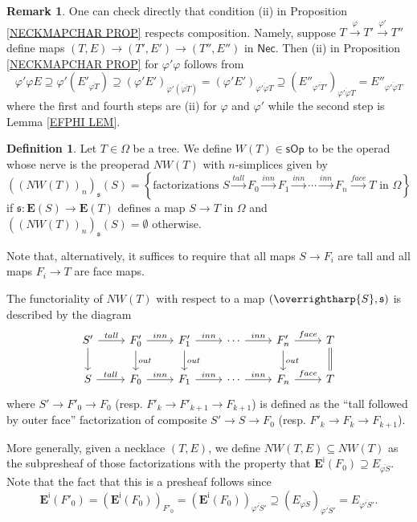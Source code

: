 \documentclass[a4paper,10pt
,draft
]{article}%
\numberwithin{equation}{section}
\numberwithin{figure}{section}
\theoremstyle{definition} %
\newtheorem{definition}[equation]{Definition}%
\newtheorem{remark}[equation]{Remark}%
\newcommand{\vect}[1]{\text{\overrightharp{\ensuremath{#1}}}}
\newcommand{\1}{\ensuremath{\mathbbm 1}}%
\begin{document}
\begin{remark}
One can check directly that 
condition (ii) in Proposition \ref{NECKMAPCHAR PROP}
respects composition.
Namely, suppose $T \xrightarrow{\varphi} T' \xrightarrow{\varphi'} T''$
define maps
$(T,E) \to (T',E') \to (T'',E'')$
in $\mathsf{Nec}$.
Then (ii) in Proposition \ref{NECKMAPCHAR PROP}
for $\varphi' \varphi$
follows from  
\[
\varphi' \varphi E
	\supseteq
\varphi'
\left(E'_{\overline{\varphi T}}\right)
	\supseteq
\left(\varphi' E'\right)_
{\overline{\varphi' (\overline{\varphi T})}}
	=
\left(\varphi' E'\right)_
{\overline{\varphi' \varphi T}}
	\supseteq
\left(
E''_{\overline{\varphi' T'}}\right)_
{\overline{\varphi' \varphi T}}
	=
E''_{\overline{\varphi' \varphi T}}
\]
where the first and fourth steps are 
(ii) for $\varphi$ and $\varphi'$
while the second step is Lemma \ref{EFPHI LEM}.
\end{remark}



\begin{definition}\label{NWTNS DEF}
	Let $T \in \Omega$ be a tree.
	We define 
	$W(T) \in \mathsf{sOp}$
	to be the operad whose nerve is the preoperad
	$NW(T)$ with $n$-simplices given by
\[
	\left(\left(NW(T)\right)_n\right)_{\mathfrak{s}}(S)
=
\left\{
\text{factorizations }
S \xrightarrow{tall} 
F_0 \xrightarrow{inn} 
F_1 \xrightarrow{inn} 
\cdots \xrightarrow{inn}
F_n \xrightarrow{face}
T
\text{ in $\Omega$}
\right\}
\]
if $\mathfrak{s} \colon \boldsymbol{E}(S) \to \boldsymbol{E}(T)$
defines a map $S \to T$ in $\Omega$
and
$\left(\left(NW(T)\right)_n\right)_{\mathfrak{s}}(S) = \emptyset$
otherwise.
	
Note that, alternatively, it suffices to require that all maps
$S \to F_i$ are tall
and all maps $F_i \to T$ are face maps.

The functoriality of 
$NW(T)$
with respect to a map $(\vect{S},\mathfrak{s})$
is described by the diagram
\[
\begin{tikzcd}
	S' \ar{r}{tall} \ar{d}
&
	F'_0 \ar{r}{inn} \ar{d}{out}
&
	F'_1 \ar{r}{inn} \ar{d}{out}
&
	\cdots \ar{r}{inn}
&
	F'_n \ar{r}{face} \ar{d}{out}
&
	T \ar[equal]{d}
\\
	S \ar{r}{tall} 
&
	F_0 \ar{r}{inn}
&
	F_1 \ar{r}{inn}
&
	\cdots \ar{r}{inn}
&
	F_n \ar{r}{face}
&
	T	
\end{tikzcd}
\]
where 
$S' \to F'_0 \to F_0$
(resp. $F'_k \to F'_{k+1} \to F_{k+1}$)
is defined as the ``tall followed by outer face''
factorization of composite
$S' \to S \to F_0$
(resp. $F'_k \to F_{k} \to F_{k+1}$).


More generally, 
given a necklace $(T,E)$,
we define
$NW(T,E) \subseteq NW(T)$
as the subpresheaf
of those factorizations with the property that
$\boldsymbol{E}^{\mathsf{i}}(F_0) \supseteq E_{\overline{\varphi S}}$.
Note that the fact that this is a presheaf follows 
since
\[
\boldsymbol{E}^{\mathsf{i}}(F'_0)
	=
\left(\boldsymbol{E}^{\mathsf{i}}(F_0)\right)_{F'_0}
	=
\left(\boldsymbol{E}^{\mathsf{i}}(F_0)\right)_{\overline{\varphi' S'}}
	\supseteq 
\left(E_{\overline{\varphi S}}\right)_{\overline{\varphi' S'}}
	= 
E_{\overline{\varphi' S'}}.
\]
\end{definition}
\end{document}

